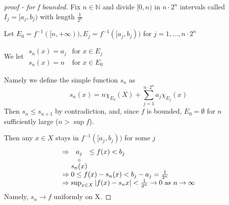 \begin{proof}[proof - for f bounded]
    Fix \(n \in \mathbb{N}\) and divide \([0,n)\) in \(n \cdot 2^n\) intervals called \(I_j = [a_j,b_j)\) with length \(\frac{1}{2^n}\)

    Let \(E_0 = f^{-1}([n, +\infty)), E_j = f^{-1}([a_j, b_j))\) for \(j = 1, \ldots, n\cdot 2^n\)
    
    We let \(\begin{array}{cc}
        s_n(x) = a_j & \mbox{for } x \in E_j \\
        s_n(x) = n & \mbox{for } x \in E_0
    \end{array}\)

    Namely we define the simple function \(s_n\) as
    \[
    s_n (x) = n\chi_{E_0}(X) + \sum_{j =1}^{n \cdot 2^n} a_j \chi_{E_j}(x)    
    \]
    Then \(s_n \leq s_{n+1}\) by contradiction, and, since \(f\) is bounded, \(E_0 = \emptyset\) for \(n\) sufficiently large (\(n > \sup f\)).

    Then any \(x \in X\) stays in \(f^{-1}([a_j, b_j))\) for some \(j\) 
    \[
        \begin{array}{l}
            \Rightarrow \stackbelow{a_j}{s_n(x)} \leq f(x) < b_j \\
            \Rightarrow 0 \leq f(x)-s_n(x) < b_j - a_j = \frac{1}{2^n} \\
            \Rightarrow \sup_{x \in X} \abs{f(x)- s_n{x}} < \frac{1}{2^n} \to 0 \mbox{ as } n \to \infty
        \end{array}
    \]
    Namely, \(s_n \to f\) uniformly on X.
\end{proof}
